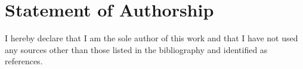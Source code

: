 \chapter{Statement of Authorship}
I hereby declare that I am the sole author of this work and that I have not used any sources other than those listed in the bibliography and identified as references.
